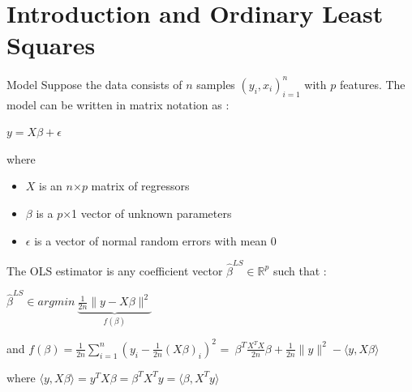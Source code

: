 \documentclass[unknownkeysallowed]{beamer}
\begin{document}
\section{Introduction and Ordinary Least Squares}
\label{sec:introdcution}



\begin{frame}
\begin{alertblock}{Model}
Suppose the data consists of $n$ samples $( y_i, x_i )^n_{i=1}$ with $p$ features. 
\newline The model can be written in matrix notation as :
\begin{center}
$y=X\beta+\epsilon$
\end{center}
where
 \begin{itemize}
        \item $X$ is an $n$$\times$$p$ matrix of regressors
        \item $\beta$  is a $p$$\times$1 vector of unknown parameters
        \item $\epsilon$ is a vector of normal random errors with mean 0 
    \end{itemize}
\end{alertblock}
\vspace{0.4cm}
\end{frame}
\begin{frame}
The OLS estimator is any coefficient vector
$\hat\beta^{LS}\in\mathbb{R}^p$ such that :
\newline
\begin{center}
$\hat\beta^{LS} \in argmin \ \underbrace{\frac{1}{2n}\|y-X\beta\|^2 }_{f(\beta)}$ 
\end{center}
\vspace{0.5cm}
and $f(\beta)=\frac{1}{2n}\sum\limits_{i=1}^n (y_{i}-\frac{1}{2n}(X\beta)_{i})^2$ =\ $\beta^T\frac{X^TX}{2n}\beta+\frac{1}{2n}\|y\|^2- \langle y,X\beta\rangle$

\vspace{0.5cm}
where 
$\langle y,X\beta\rangle=y^TX\beta=\beta^TX^Ty=\langle \beta,X^Ty\rangle$


\end{frame}
\end{document}
